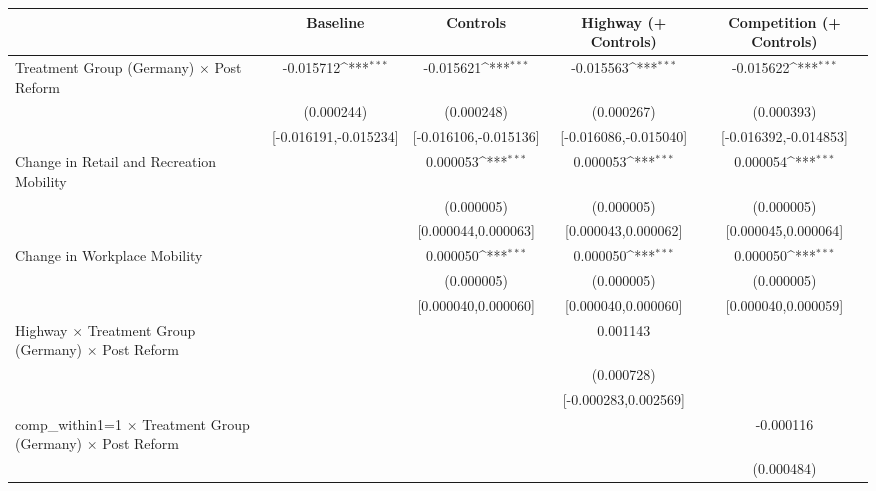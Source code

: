 {
\def\sym#1{\ifmmode^{#1}\else\(^{#1}\)\fi}
\begin{tabular}{l*{4}{c}}
\toprule
                    &\multicolumn{1}{c}{Baseline}&\multicolumn{1}{c}{Controls}&\multicolumn{1}{c}{Highway (+ Controls)}&\multicolumn{1}{c}{Competition (+ Controls)}\\
\midrule
Treatment Group (Germany) $\times$ Post Reform&   -0.015712\sym{***}&   -0.015621\sym{***}&   -0.015563\sym{***}&   -0.015622\sym{***}\\
                    &  (0.000244)         &  (0.000248)         &  (0.000267)         &  (0.000393)         \\
                    &[-0.016191,-0.015234]         &[-0.016106,-0.015136]         &[-0.016086,-0.015040]         &[-0.016392,-0.014853]         \\
Change in Retail and Recreation Mobility&                     &    0.000053\sym{***}&    0.000053\sym{***}&    0.000054\sym{***}\\
                    &                     &  (0.000005)         &  (0.000005)         &  (0.000005)         \\
                    &                     &[0.000044,0.000063]         &[0.000043,0.000062]         &[0.000045,0.000064]         \\
Change in Workplace Mobility&                     &    0.000050\sym{***}&    0.000050\sym{***}&    0.000050\sym{***}\\
                    &                     &  (0.000005)         &  (0.000005)         &  (0.000005)         \\
                    &                     &[0.000040,0.000060]         &[0.000040,0.000060]         &[0.000040,0.000059]         \\
Highway $\times$ Treatment Group (Germany) $\times$ Post Reform&                     &                     &    0.001143         &                     \\
                    &                     &                     &  (0.000728)         &                     \\
                    &                     &                     &[-0.000283,0.002569]         &                     \\
comp\_within1=1 $\times$ Treatment Group (Germany) $\times$ Post Reform&                     &                     &                     &   -0.000116         \\
                    &                     &                     &                     &  (0.000484)         \\

\end{tabular}}
